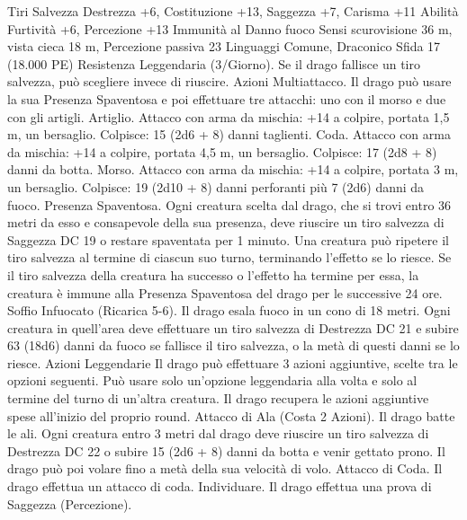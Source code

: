 \begin{multicols}{2}
Tiri Salvezza Destrezza +6, Costituzione +13, Saggezza +7,
Carisma +11
Abilità Furtività +6, Percezione +13
Immunità al Danno fuoco
Sensi scurovisione 36 m, vista cieca 18 m, Percezione passiva 23
Linguaggi Comune, Draconico
Sfida 17 (18.000 PE)
Resistenza Leggendaria (3/Giorno). Se il drago fallisce un tiro
salvezza, può scegliere invece di riuscire.
Azioni
Multiattacco. Il drago può usare la sua Presenza Spaventosa e
poi effettuare tre attacchi: uno con il morso e due con gli artigli.
Artiglio. Attacco con arma da mischia: +14 a colpire, portata 1,5
m, un bersaglio.
Colpisce: 15 (2d6 + 8) danni taglienti.
Coda. Attacco con arma da mischia: +14 a colpire, portata 4,5
m, un bersaglio.
Colpisce: 17 (2d8 + 8) danni da botta.
Morso. Attacco con arma da mischia: +14 a colpire, portata 3 m,
un bersaglio.
Colpisce: 19 (2d10 + 8) danni perforanti più 7 (2d6) danni da
fuoco.
Presenza Spaventosa. Ogni creatura scelta dal drago, che si trovi
entro 36 metri da esso e consapevole della sua presenza, deve
riuscire un tiro salvezza di Saggezza DC 19 o restare spaventata
per 1 minuto. Una creatura può ripetere il tiro salvezza al termine
di ciascun suo turno, terminando l’effetto se lo riesce. Se il tiro
salvezza della creatura ha successo o l’effetto ha termine per
essa, la creatura è immune alla Presenza Spaventosa del drago
per le successive 24 ore.
Soffio Infuocato (Ricarica 5-6). Il drago esala fuoco in un cono
di 18 metri. Ogni creatura in quell’area deve effettuare un tiro
salvezza di Destrezza DC 21 e subire 63 (18d6) danni da fuoco
se fallisce il tiro salvezza, o la metà di questi danni se lo riesce.
Azioni Leggendarie
Il drago può effettuare 3 azioni aggiuntive, scelte tra le opzioni
seguenti. Può usare solo un’opzione leggendaria alla volta e solo
al termine del turno di un’altra creatura. Il drago recupera le
azioni aggiuntive spese all’inizio del proprio round.
Attacco di Ala (Costa 2 Azioni). Il drago batte le ali. Ogni
creatura entro 3 metri dal drago deve riuscire un tiro salvezza di
Destrezza DC 22 o subire 15 (2d6 + 8) danni da botta e venir
gettato prono. Il drago può poi volare fino a metà della sua
velocità di volo.
Attacco di Coda. Il drago effettua un attacco di coda.
Individuare. Il drago effettua una prova di Saggezza
(Percezione).
 

\end{multicols}
